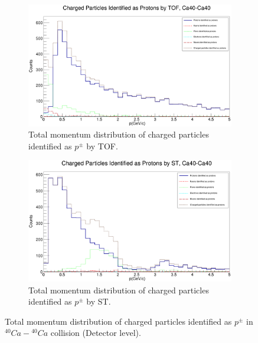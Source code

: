\documentclass[12pt, twocolumn]{article}
\begin{document}
\begin{figure}[h]
\centering
\begin{subfigure}[h]{0.49\textwidth}
\centering
\includegraphics[scale=0.14]{Detector_pToT_protons(tof)_Ca.png}
\caption{Total momentum distribution of charged particles identified as $p^{\pm}$ by TOF.}
\label{Detector - Total momentum distribution of protons (TOF) Ca40.}
\end{subfigure}
\hfill
\begin{subfigure}[h]{0.49\textwidth}
\centering
\includegraphics[scale=0.14]{Detector_pToT_protons(st)_Ca.png}
\caption{Total momentum distribution of charged particles identified as $p^{\pm}$ by ST.}
\label{Detector - Total momentum distribution of protons (ST) Ca40.}
\end{subfigure}
\caption{Total momentum distribution of charged particles identified as $p^{\pm}$ in $^{40}Ca-{^{40}Ca}$ collision (Detector level).}
\label{Total momentum distribution of charged particles identified as protons in Ca40-Ca40 collision.}
\end{figure}
\end{document}

